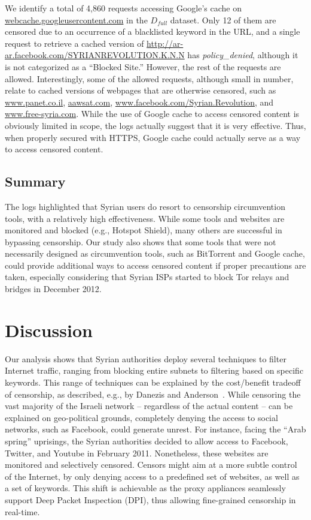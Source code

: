 \documentclass{sig-alternate-2013}
\newcommand{\descr}[1]{\smallskip\noindent{\bf #1}}
\def\df{$D_{full}$\xspace}
\newcommand{\policydenied}{\emph{policy\_denied}\xspace}
\begin{document}
We identify a total of 4,860 requests accessing Google's cache on  \url{webcache.googleusercontent.com} in the \df dataset. Only 12 of them are censored due to an occurrence of a blacklisted keyword in the URL, and a single request to retrieve a cached version of \url{http://ar-ar.facebook.com/SYRIANREVOLUTION.K.N.N} has \policydenied, although it is not categorized as a ``Blocked Site.'' However, the rest of the requests are allowed. Interestingly, some of the allowed requests, although small in number, relate to cached versions of webpages that are otherwise censored, such as \url{www.panet.co.il}, \url{aawsat.com}, \url{www.facebook.com/Syrian.Revolution}, and \url{www.free-syria.com}. 
While the use of Google cache to access censored content is obviously limited in scope, the logs actually suggest that it is very effective. Thus, when properly secured with HTTPS, Google cache could actually serve as a way to access censored content.


\subsection{Summary}
The logs highlighted that Syrian users do resort to censorship circumvention tools, with a relatively high effectiveness. While some tools and websites are monitored and blocked (e.g., Hotspot Shield), many others are successful in bypassing censorship. Our study also shows that 
some tools that were not necessarily designed as circumvention tools, such as BitTorrent and Google cache, could provide additional ways to access censored content if proper precautions are taken, especially considering that Syrian ISPs started to block Tor relays and bridges in December 2012.


\section{Discussion}
\label{sec:discussion}


\descr{Economics of Censorship.} Our analysis shows that Syrian authorities deploy several techniques to filter Internet traffic, ranging from blocking entire subnets to filtering based on specific keywords. This range of techniques can be explained by the cost/benefit tradeoff of censorship, as described, e.g., by Danezis and 
Anderson~\cite{danezis}. While censoring the vast majority of the Israeli network -- regardless of the actual content -- can be explained on geo-political grounds, completely denying the access to social networks, such as Facebook, could generate unrest. For instance, facing the ``Arab spring'' uprisings, the Syrian authorities decided to allow access to Facebook, Twitter, and Youtube in February 2011.
Nonetheless, these websites are monitored and selectively censored. Censors might aim at a more subtle control of the Internet, by only denying access to a predefined set of websites, as well as a set of keywords. This shift is achievable as the proxy appliances seamlessly support Deep Packet Inspection (DPI), thus allowing fine-grained censorship in real-time.    
\end{document}
